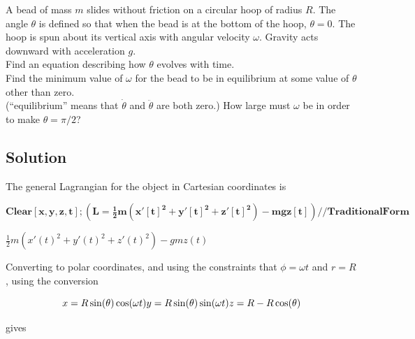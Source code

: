 \documentclass{article}
\begin{document}
A bead of mass \(m\) slides without friction on a circular hoop of radius \(R\). The angle \(\theta\) is defined so that when the bead is at the
bottom of the hoop, \(\theta =0\). The hoop is spun about its vertical axis with angular velocity \(\omega\). Gravity acts downward with acceleration
\(g\).\\
Find an equation describing how \(\theta\) evolves with time.\\
Find the minimum value of \(\omega\) for the bead to be in equilibrium at some value of \(\theta\) other than zero.\\
({``}equilibrium{''} means that \(\dot{\theta }\) and \(\ddot{\theta }\) are both zero.) How large must \(\omega\) be in order to make \(\theta =\pi
/2\)?

\subsection*{Solution}

The general Lagrangian for the object in Cartesian coordinates is

\begin{doublespace}
\noindent\(\pmb{\text{Clear}[x,y,z,t];\left(L=\frac{1}{2}m\left(x'[t]^2+y'[t]^2+z'[t]^2\right)-m g z[t]\right)\text{//}\text{TraditionalForm}}\)
\end{doublespace}

\begin{doublespace}
\noindent\(\frac{1}{2} m \left(x'(t)^2+y'(t)^2+z'(t)^2\right)-g m z(t)\)
\end{doublespace}

Converting to polar coordinates, and using the constraints that \(\phi =\omega  t\) and \(r=R\), using the conversion

\[x=R \sin (\theta ) \cos (\omega  t)\\
\\
y=R \sin (\theta ) \sin (\omega  t)\\
\\
z=R-R \cos (\theta )\]

gives
\end{document}
